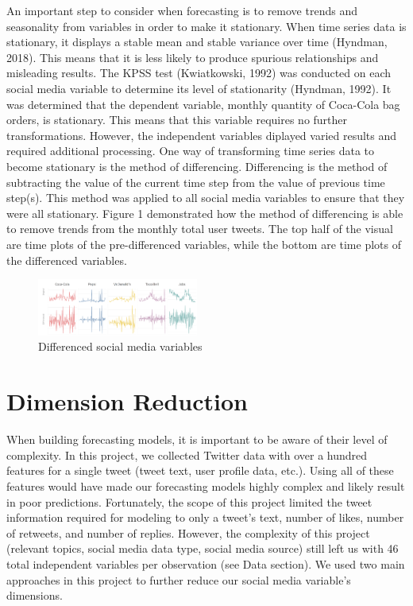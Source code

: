 \documentclass[12pt,oneside]{chicagocapstone}
\begin{document}
An important step to consider when forecasting is to remove trends and seasonality from variables in order to make it stationary. When time series data is stationary, it displays a stable mean and stable variance over time (Hyndman, 2018). This means that it is less likely to produce spurious relationships and misleading results. The KPSS test (Kwiatkowski, 1992) was conducted on each social media variable to determine its level of stationarity (Hyndman, 1992). It was determined that the dependent variable, monthly quantity of Coca-Cola bag orders, is stationary. This means that this variable requires no further transformations. However, the independent variables diplayed varied results and required additional processing. One way of transforming time series data to become stationary is the method of differencing. Differencing is the method of subtracting the value of the current time step from the value of previous time step(s). This method was applied to all social media variables to ensure that they were all stationary. Figure 1 demonstrated how the method of differencing is able to remove trends from the monthly total user tweets. The top half of the visual are time plots of the pre-differenced variables, while the bottom are time plots of the differenced variables.
\begin{figure}

{\centering \includegraphics[width=200px,angle = 0, scale=2.1]{figure/differencing} 

}

\caption{Differenced social media variables}\label{fig:differencing}
\end{figure}
\hypertarget{dimension-reduction}{%
\section*{Dimension Reduction}\label{dimension-reduction}}

When building forecasting models, it is important to be aware of their level of complexity. In this project, we collected Twitter data with over a hundred features for a single tweet (tweet text, user profile data, etc.). Using all of these features would have made our forecasting models highly complex and likely result in poor predictions. Fortunately, the scope of this project limited the tweet information required for modeling to only a tweet's text, number of likes, number of retweets, and number of replies. However, the complexity of this project (relevant topics, social media data type, social media source) still left us with 46 total independent variables per observation (see Data section). We used two main approaches in this project to further reduce our social media variable's dimensions.
\end{document}
